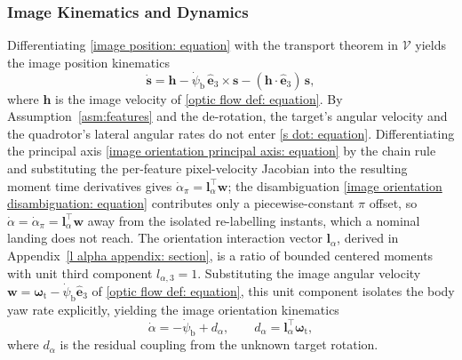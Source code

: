 \documentclass{IEEEtaes}
\theoremstyle{definition}
\theoremstyle{remark}
\begin{document}
\subsubsection{Image Kinematics and Dynamics} \label{image kinematics: section}
Differentiating \eqref{image position: equation} with the transport theorem in $\mathcal{V}$ yields the image position kinematics
\begin{equation} \label{s dot: equation}
    \dot{\boldsymbol{s}} = \boldsymbol{h} - \dot{\psi}_\text{b}\,\hat{\boldsymbol{e}}_3\times\boldsymbol{s} - (\boldsymbol{h}\cdot\hat{\boldsymbol{e}}_3)\,\boldsymbol{s},
\end{equation}
where $\boldsymbol{h}$ is the image velocity of \eqref{optic flow def: equation}. By Assumption~\ref{asm:features} and the de-rotation, the target's angular velocity and the quadrotor's lateral angular rates do not enter \eqref{s dot: equation}. Differentiating the principal axis \eqref{image orientation principal axis: equation} by the chain rule and substituting the per-feature pixel-velocity Jacobian into the resulting moment time derivatives gives $\dot{\alpha}_\pi=\boldsymbol{l}_\alpha^\top\boldsymbol{w}$; the disambiguation \eqref{image orientation disambiguation: equation} contributes only a piecewise-constant $\pi$ offset, so $\dot{\alpha}=\dot{\alpha}_\pi=\boldsymbol{l}_\alpha^\top\boldsymbol{w}$ away from the isolated re-labelling instants, which a nominal landing does not reach. The orientation interaction vector $\boldsymbol{l}_\alpha$, derived in Appendix~\ref{l alpha appendix: section}, is a ratio of bounded centered moments with unit third component $l_{\alpha,3}=1$. Substituting the image angular velocity $\boldsymbol{w} = \boldsymbol{\omega}_\text{t} - \dot{\psi}_\text{b}\hat{\boldsymbol{e}}_3$ of \eqref{optic flow def: equation}, this unit component isolates the body yaw rate explicitly, yielding the image orientation kinematics
\begin{equation} \label{alpha dot: equation}
    \dot{\alpha} = - \dot{\psi}_\text{b} + d_{\alpha},\qquad d_\alpha = \boldsymbol{l}_\alpha^\top\boldsymbol{\omega}_\text{t},
\end{equation}
where $d_{\alpha}$ is the residual coupling from the unknown target rotation.
\end{document}
